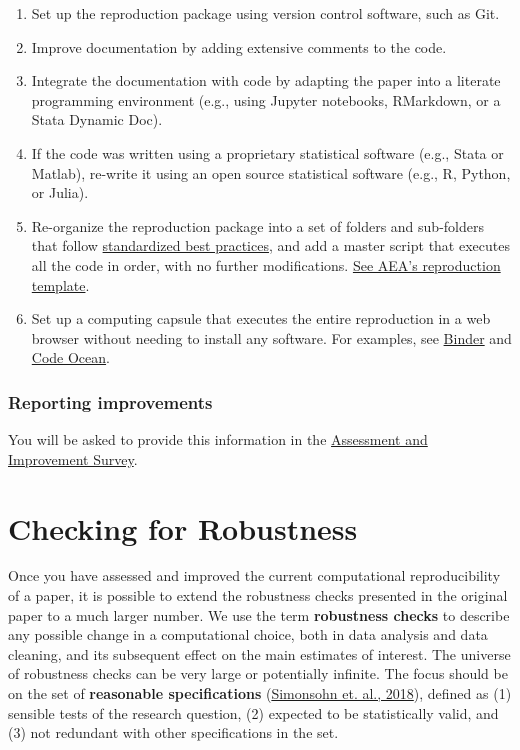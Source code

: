 \documentclass[]{book}
\providecommand{\tightlist}{%
  \setlength{\itemsep}{0pt}\setlength{\parskip}{0pt}}
\begin{document}
\begin{enumerate}
\def\labelenumi{\arabic{enumi}.}
\tightlist
\item
  Set up the reproduction package using version control software, such as Git.
\item
  Improve documentation by adding extensive comments to the code.
\item
  Integrate the documentation with code by adapting the paper into a literate programming environment (e.g., using Jupyter notebooks, RMarkdown, or a Stata Dynamic Doc).
\item
  If the code was written using a proprietary statistical software (e.g., Stata or Matlab), re-write it using an open source statistical software (e.g., R, Python, or Julia).
\item
  Re-organize the reproduction package into a set of folders and sub-folders that follow \href{https://www.projecttier.org/tier-protocol/specifications/\#overview-of-the-documentation}{standardized best practices}, and add a master script that executes all the code in order, with no further modifications. \href{https://github.com/AEADataEditor/replication-template}{See AEA's reproduction template}.\\
\item
  Set up a computing capsule that executes the entire reproduction in a web browser without needing to install any software. For examples, see \href{https://mybinder.org/}{Binder} and \href{https://codeocean.com/}{Code Ocean}.
\end{enumerate}

\hypertarget{reporting-improvements}{%
\subsection{Reporting improvements}\label{reporting-improvements}}

You will be asked to provide this information in the \href{ADD\%20LINK}{Assessment and Improvement Survey}.

\hypertarget{robust}{%
\chapter{Checking for Robustness}\label{robust}}

Once you have assessed and improved the current computational reproducibility of a paper, it is possible to extend the robustness checks presented in the original paper to a much larger number. We use the term \textbf{robustness checks} to describe any possible change in a computational choice, both in data analysis and data cleaning, and its subsequent effect on the main estimates of interest. The universe of robustness checks can be very large or potentially infinite. The focus should be on the set of \textbf{reasonable specifications} (\href{https://urisohn.com/sohn_files/wp/wordpress/wp-content/uploads/Paper-Specification-curve-2018-11-02.pdf}{Simonsohn et. al., 2018}), defined as (1) sensible tests of the research question, (2) expected to be statistically valid, and (3) not redundant with other specifications in the set.
\end{document}
